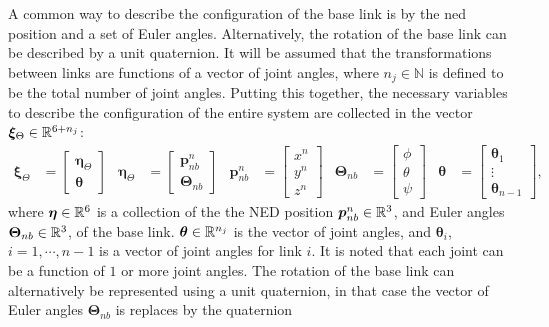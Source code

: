 A common way to describe the configuration of the base link is by the \gls{ned}
position and a set of Euler angles. Alternatively, the rotation of the base link
can be described by a unit quaternion. It will be assumed that the transformations
between links are functions of a vector of joint angles, where
$n_j \in \mathbb{N}$ is defined to be the total number of joint angles. Putting this together,
the necessary variables to describe the configuration of the entire system are
collected in the vector $\bm{\xi}_{\Theta} \in \mathbb{R}^{6+n_j}$:
\begin{align}
    \bm{\xi}_{\Theta} &= \begin{bmatrix}\bm{\eta}_{\Theta} \\ \bm{\theta} \end{bmatrix} &
        \bm{\eta}_{\Theta} &= \begin{bmatrix}\bm{p}_{nb}^n \\ \bm{\Theta}_{nb} \end{bmatrix} &
            \bm{p}_{nb}^n &= \begin{bmatrix}x^n \\ y^n \\ z^n \end{bmatrix} &
                \bm{\Theta}_{nb} &= \begin{bmatrix}\phi \\ \theta \\ \psi \end{bmatrix} &
                    \bm{\theta} &= \begin{bmatrix}\bm{\theta}_1 \\ \vdots \\ \bm{\theta}_{n-1}\end{bmatrix},
\end{align}
where $\bm{\eta} \in \mathbb{R}^6$ is a collection of the the NED position $\bm{p}_{nb}^n \in \mathbb{R}^3$,
and Euler angles $\bm{\Theta}_{nb} \in \mathbb{R}^3$, of the base
link. $\bm{\theta} \in \mathbb{R}^{n_j}$ is the vector of joint angles, and $\bm{\theta}_i$, $i = 1,\cdots,n-1$
is a vector of joint angles for link $i$. It is noted that each joint can be a function of $1$ or
more joint angles.
The rotation of the base link can alternatively be represented using a unit quaternion,
in that case the vector of Euler angles $\bm{\Theta}_{nb}$ is replaces by the quaternion
